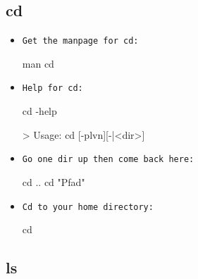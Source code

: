 \documentclass[10pt,a4paper]{scrartcl}
\begin{document}
\subsection{cd}

\begin{itemize}
\item \texttt{Get the manpage for cd:}

\begin{terminalcode}
man cd
\end{terminalcode}

\item \texttt{Help for cd:}
\begin{terminalcode}
cd -help

> Usage: cd [-plvn][-|<dir>]
\end{terminalcode}

\item \texttt{Go one dir up then come back here:}
\begin{terminalcode}
cd ..
cd "Pfad" 
\end{terminalcode}

\item \texttt{Cd to your home directory:}
\begin{terminalcode}
cd
\end{terminalcode}

\end{itemize}

\subsection{ls}
\end{document}
